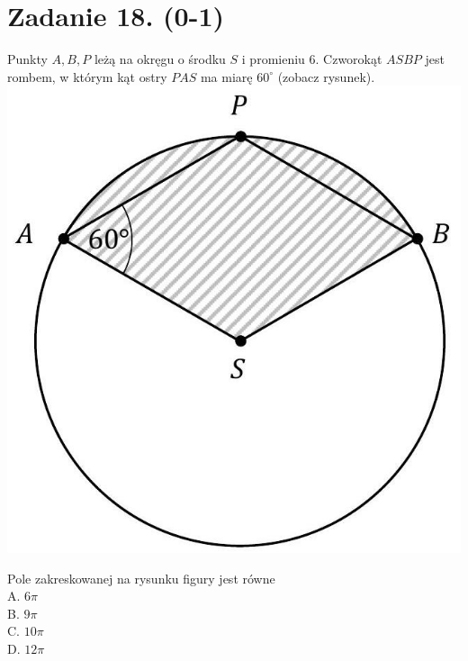 \documentclass[10pt]{article}
\begin{document}
\section*{Zadanie 18. (0-1)}
Punkty \(A, B, P\) leżą na okręgu o środku \(S\) i promieniu 6. Czworokąt \(A S B P\) jest rombem, w którym kąt ostry \(P A S\) ma miarę \(60^{\circ}\) (zobacz rysunek).\\
\includegraphics[max width=\textwidth, center]{2024_11_21_465acd0c12fa3e05e8a7g-10}

Pole zakreskowanej na rysunku figury jest równe\\
A. \(6 \pi\)\\
B. \(9 \pi\)\\
C. \(10 \pi\)\\
D. \(12 \pi\)
\end{document}
